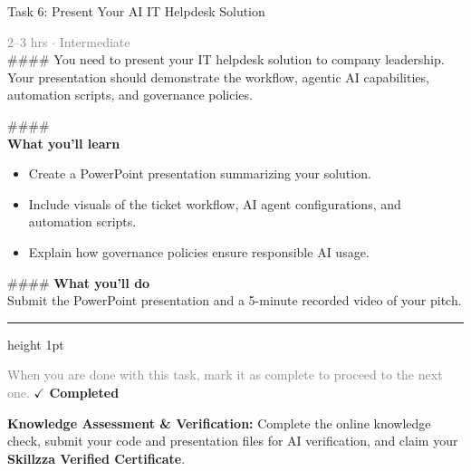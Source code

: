 \documentclass[10pt,a4paper]{article}
\begin{document}
\begin{taskbox}{Task 6: Present Your AI IT Helpdesk Solution}

    {\small \textcolor{gray}{2--3 hrs $\cdot$ Intermediate}}\\[12pt]

    \#\#\#\#   
You need to present your IT helpdesk solution to company leadership. Your presentation should demonstrate the workflow, agentic AI capabilities, automation scripts, and governance policies.  

\#\#\#\# \\[10pt]
\vspace{8pt}
{\large \textbf{\textcolor{brandLight}{What you'll learn}}}\\[4pt]  
\begin{itemize}
    \item Create a PowerPoint presentation summarizing your solution.  
    \item Include visuals of the ticket workflow, AI agent configurations, and automation scripts.  
    \item Explain how governance policies ensure responsible AI usage.  
\end{itemize}

\#\#\#\# \vspace{8pt}
{\large \textbf{\textcolor{brandLight}{What you'll do}}}\\[4pt]  
Submit the PowerPoint presentation and a 5-minute recorded video of your pitch.\par

    \vspace{16pt}

    \textcolor{cardBorder}{\hrule height 1pt}\vspace{8pt}

    \small \textcolor{gray}{When you are done with this task, mark it as complete to proceed to the next one.} \hfill \textbf{\textcolor{brandDark}{$\checkmark$ Completed}}

\end{taskbox}

\begin{completionbox}
    \textbf{Knowledge Assessment \& Verification:} Complete the online knowledge check, submit your code and presentation files for AI verification, and claim your \textbf{Skillzza Verified Certificate}.
\end{completionbox}

\newpage

\end{document}
